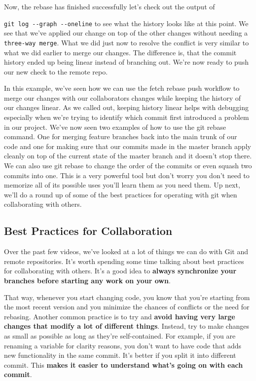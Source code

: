 	Now, the rebase has finished successfully let's check out the output of
	
	\verb|git log --graph --oneline| to see what the history looks like at this point. We see that we've applied our change on top of the other changes without needing a \verb|three-way merge|. What we did just now to resolve the conflict is very similar to what we did earlier to merge our changes. The difference is, that the commit history ended up being linear instead of branching out. We're now ready to push our new check to the remote repo.
	
	In this example, we've seen how we can use the fetch rebase push workflow to merge our changes with our collaborators changes while keeping the history of our changes linear. 
	As we called out, keeping history linear helps with debugging especially when we're trying to identify which commit first introduced a problem in our project. 
	We've now seen two examples of how to use the git rebase command. 
	One for merging feature branches back into the main trunk of our code and one for making sure that our commits made in the master branch apply cleanly on top of the current state of the master branch and it doesn't stop there. We can also use git rebase to change the order of the commits or even squash two commits into one. 
	This is a very powerful tool but don't worry you don't need to memorize all of its possible uses you'll learn them as you need them. 
	Up next, we'll do a round up of some of the best practices for operating with git when collaborating with others.

	\subsection{Best Practices for Collaboration} \label{W303e}

	Over the past few videos, we've looked at a lot of things we can do with Git and remote repositories. It's worth spending some time talking about best practices for collaborating with others. It's a good idea to \textbf{always synchronize your branches before starting any work on your own}.
	
	That way, whenever you start changing code, you know that you're starting from the most recent version and you minimize the chances of conflicts or the need for rebasing. Another common practice is to try and \textbf{avoid having very large changes that modify a lot of different things}. Instead, try to make changes as small as possible as long as they're self-contained. For example, if you are renaming a variable for clarity reasons, you don't want to have code that adds new functionality in the same commit. It's better if you split it into different commit. This \textbf{makes it easier to understand what's going on with each commit}.
	
